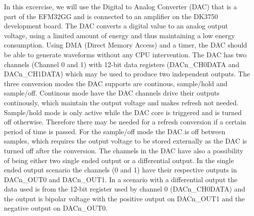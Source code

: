 In this excercise, we will use the Digital to Analog Converter (DAC) that is a
part of the EFM32GG and is connected to an amplifier on the DK3750 development
board. \cite{TDT4528Compendium} The DAC converts a digital value to an analog
output voltage, using a limited amount of energy and thus maintaining a low
energy consumption. Using DMA (Direct Memory Access) and a timer, the DAC should
be able to generate waveforms without any CPU intervention. The DAC has two
channels (Channel 0 and 1) with 12-bit data registers (DACn_CH0DATA and
DACn_CH1DATA) which may be used to produce two independent outputs. The three
conversion modes the DAC supports are continous, sample/hold and sample/off.
Continous mode have the DAC channels drive their outputs continously, which
maintain the output voltage and makes refresh not needed. Sample/hold mode is
only active while the DAC core is triggered and is turned off otherwise.
Therefore there may be needed for a refresh conversion if a certain period of
time is passed. For the sample/off mode the DAC is off between samples, which
requires the output voltage to be stored externally as the DAC is turned off
after the conversion. The channels in the DAC have also a possibility of being
either two single ended output or a differential output. In the single ended
output scenario the channels (0 and 1) have their respective outputs in
DACn_OUT0 and DACn_OUT1. In a scenario with a differential output the data used
is from the 12-bit register used by channel 0 (DACn_CH0DATA) and the output is
bipolar voltage with the positive output on DACn_OUT1 and the negative output on
DACn_OUT0.















